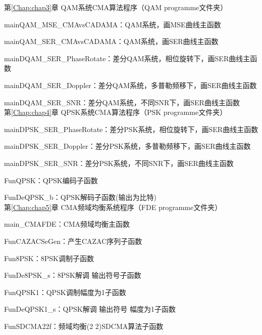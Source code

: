 
\begin{ProgramList}

第\ref{Chap:chap3}章 QAM系统CMA算法程序（QAM programme文件夹）

mainQAM\_MSE\_CMAvsCADAMA：QAM系统，画MSE曲线主函数

mainQAM\_SER\_CMAvsCADAMA：QAM系统，画SER曲线主函数

mainDQAM\_SER\_PhaseRotate：差分QAM系统，相位旋转下，画SER曲线主函数

mainDQAM\_SER\_Doppler：差分QAM系统，多普勒频移下，画SER曲线主函数

mainDQAM\_SER\_SNR：差分QAM系统，不同SNR下，画SER曲线主函数
\\









第\ref{Chap:chap4}章 QPSK系统CMA算法程序（PSK programme文件夹）

mainDPSK\_SER\_PhaseRotate：差分PSK系统，相位旋转下，画SER曲线主函数

mainDPSK\_SER\_Doppler：差分PSK系统，多普勒频移下，画SER曲线主函数

mainDPSK\_SER\_SNR：差分PSK系统，不同SNR下，画SER曲线主函数

FunQPSK：QPSK编码子函数

FunDeQPSK\_b：QPSK解码子函数(输出为比特)
\\












第\ref{Chap:chap5}章 CMA频域均衡系统程序（FDE programme文件夹）

main\_CMAFDE：CMA频域均衡主函数

FunCAZACSeGen：产生CAZAC序列子函数

Fun8PSK：8PSK调制子函数

FunDe8PSK\_s：8PSK解调 输出符号子函数

FunQPSK1：QPSK调制幅度为1子函数

FunDeQPSK1\_s：QPSK解调 输出符号 幅度为1子函数

FunSDCMA22f：频域均衡(2 2)SDCMA算法子函数


\end{ProgramList}
